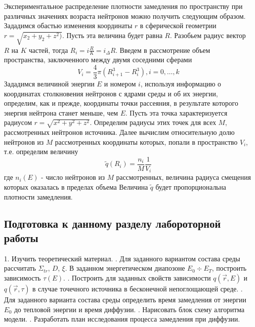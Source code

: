 \documentclass[a4paper]{article}
\begin{document}
    Экспериментальное распределение плотности замедления по
    пространству при различных значениях возраста нейтронов можно
    получить следующим образом. Зададимся обастью изменения
    координаты $r$ в сферической геометрии
    \(r = \sqrt{x_2 + y_2 + z^2)}\). Пусть эта величина будет равна
    $R$. Разобьем радиус вектор $R$ на $K$ частей, тогда
    \(R_i=i\frac{R}{K} = i_\Delta R\). Введем в рассмотрение объем
    пространства, заключенного между двумя соседними сферами
    \begin{equation}\nonumber
        V_i = \frac{4}{3}\pi(R_{i+1}^3 - R_i^3), i=0,\dots,k
    \end{equation}
    Зададимся величиной энергии $E$ и номером $i$, используя
    информацию о координатах столкновения нейтронов с ядрами среды
    и об их энергии, определим, как и прежде, координаты точки
    рассеяния, в результате которого энергия нейтрона станет меньше,
    чем $E$. Пусть эта точка характеризуется радиусом
    \(r=\sqrt{x^2+y^2+z^2}\). Определим радиусы этих точек для всех
    $M$, рассмотренных нейтронов источника. Далее вычислим
    относительную долю нейтронов из $M$ рассмотренных координаты
    которых, попали в пространство $V_i$, т.е. определим величину
    \begin{equation}\nonumber
        \tilde{q}(R_i)=\frac{n_i}{M}\frac{1}{V_i}
    \end{equation}
    где $n_i(E)$ - число нейтронов из $M$ рассмотренных, величина
    радиуса смещения которых оказалась в пределах объема
    Величина $\tilde{q}$ будет пропорциональна плотности замедления.

    \subsection{Подготовка к данному разделу лабороторной работы}
    1. Изучить теоретический материал.
    . Для заданного вариантом состава среды рассчитать $\Sigma_{tr}$,
    $D$, $\xi$. В заданном энергетическом диапозоне $E_0 \div E_T$,
    построить зависимость $\tau(E)$.
    . Построить для заданных свойств зависимости $q(\vec{r},E)$ и
    $q(\vec{r},\tau)$ в случае точечного источника в бесконечной
    непоглощающей среде.
    . Для заданного варианта состава среды определить время
    замедления от энергии $E_0$ до тепловой энергии и время диффузии.
    . Нарисовать блок схему алгоритма модели.
    . Разработать план исследования процесса замедления при диффузии.
\end{document}
